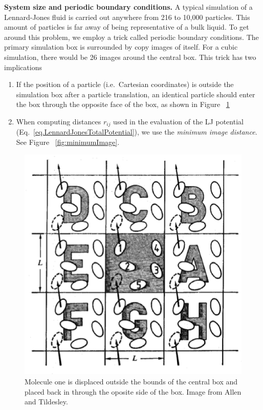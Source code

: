 \documentclass[aip,jcp,preprint,superscriptaddress,floatfix]{revtex4-1}
\begin{document}
\textbf{System size and periodic boundary conditions.} 
A typical simulation of a Lennard-Jones fluid is carried out anywhere from 216 to 10,000 particles. 
This amount of particles is far away of being representative of a bulk liquid. 
To get around this problem, we employ a trick called periodic boundary conditions. 
The primary simulation box is surrounded
by copy images of itself. For a cubic simulation, there would be 26 
images around the central box. This trick has two implications
\begin{enumerate}
\setlength{\itemsep}{0em} %
	\item If the position of a particle (i.e.\ Cartesian coordinates) is
		outside the simulation box after a particle translation, 
		an identical particle should enter the box through the
		opposite face of the box, as shown in Figure ~\ref{fig:pbc} 
	\item When computing distances $r_{ij}$ used in the evaluation of the LJ potential (Eq.~\ref{eq.LennardJonesTotalPotential}), we use the \textit{minimum image distance}. See Figure ~\ref{fig:minimumImage}.
\end{enumerate}

\begin{figure}[t]
        \includegraphics[scale = 0.5]{pbc.eps}
        \caption{Molecule one is displaced outside the bounds of the central box and placed back
        in through the oposite side of the box. Image from Allen and Tildesley. ~\cite{Allen.Book}}
        \centering
        \label{fig:pbc}
\end{figure}
\end{document}
